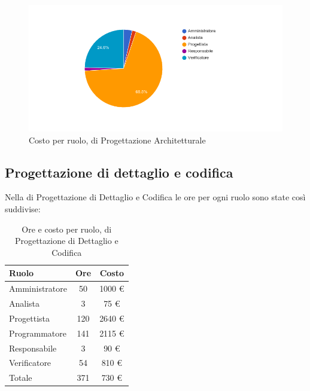 \begin{figure}[H]
  \begin{center}
    \includegraphics[width=15cm]{res/img/prospettoEconomico/costoPerRuoloProgettazioneArchitetturale.png}
  \caption{Costo per ruolo,  di Progettazione Architetturale}
  \end{center} 
\end{figure}  


\subsection{Progettazione di dettaglio e codifica}
Nella  di Progettazione di Dettaglio e Codifica le ore per ogni ruolo sono state così suddivise:

\begin{table}[H]
	\centering
	\begin{tabular}{ l c c }
		\textbf{Ruolo} & \textbf{Ore} & \textbf{Costo} \\
		\hline
		Amministratore & 50 & 1000 \euro{} \\
		Analista & 3 & 75 \euro{} \\
		Progettista & 120 & 2640 \euro{} \\
		Programmatore & 141 & 2115 \euro{} \\
		Responsabile & 3 & 90 \euro{} \\
		Verificatore & 54 & 810 \euro{} \\
		\hline
		Totale & 371 & 730 \euro{} \\
		\hline
	\end{tabular}
	\caption{Ore e costo per ruolo,  di Progettazione di Dettaglio e Codifica}
\end{table}

